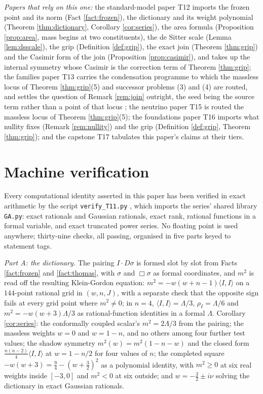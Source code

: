 \documentclass[11pt]{article}
\theoremstyle{definition}
\newcommand{\ip}[2]{\langle #1, #2\rangle}
\begin{document}
\emph{Papers that rely on this one:} the standard-model paper T12 \cite{ButlerT12} imports the frozen point and its norm (Fact \ref{fact:frozen}), the dictionary and its weight polynomial (Theorem \ref{thm:dictionary}, Corollary \ref{cor:series}), the area formula (Proposition \ref{prop:area}, mass begins at two constituents), the de Sitter scale (Lemma \ref{lem:dsscale}), the grip (Definition \ref{def:grip}), the exact join (Theorem \ref{thm:grip}) and the Casimir form of the join (Proposition \ref{prop:casimir}), and takes up the internal symmetry whose Casimir is the correction term of Theorem \ref{thm:grip}; the families paper T13 \cite{ButlerT13} carries the condensation programme to which the massless locus of Theorem \ref{thm:grip}(5) and successor problems (3) and (4) are routed, and settles the question of Remark \ref{rem:join} outright, the seed being the source term rather than a point of that locus \cite[Props.~4.1-4.2]{ButlerT13}; the neutrino paper T15 \cite{ButlerT15} is routed the massless locus of Theorem \ref{thm:grip}(5); the foundations paper T16 \cite{ButlerT16} imports what nullity fixes (Remark \ref{rem:nullity}) and the grip (Definition \ref{def:grip}, Theorem \ref{thm:grip}); and the capstone T17 \cite{ButlerT17} tabulates this paper's claims at their tiers.

\section{Machine verification}\label{sec:verification}

Every computational identity asserted in this paper has been verified in exact arithmetic by the script \texttt{verify\_T11.py} \cite{ButlerVerifyT11}, which imports the series' shared library \texttt{GA.py}: exact rationals and Gaussian rationals, exact rank, rational functions in a formal variable, and exact truncated power series. No floating point is used anywhere; thirty-nine checks, all passing, organised in five parts keyed to statement tags.

\emph{Part A: the dictionary.} The pairing $I \cdot D\sigma$ is formed slot by slot from Facts \ref{fact:frozen} and \ref{fact:thomas}, with $\sigma$ and $\Box\sigma$ as formal coordinates, and $m^{2}$ is read off the resulting Klein-Gordon equation: $m^{2} = -w(w+n-1)\ip{I}{I}$ on a $144$-point rational grid in $(w, n, J)$, with a separate check that the opposite sign fails at every grid point where $m^{2} \neq 0$; in $n = 4$, $\ip{I}{I} = \Lambda/3$, $\rho_{I} = \Lambda/6$ and $m^{2} = -w(w+3)\Lambda/3$ as rational-function identities in a formal $\Lambda$. Corollary \ref{cor:series}: the conformally coupled scalar's $m^{2} = 2\Lambda/3$ from the pairing; the massless weights $w = 0$ and $w = 1-n$, and no others among four further test values; the shadow symmetry $m^{2}(w) = m^{2}(1-n-w)$ and the closed form $\tfrac{n(n-2)}{4}\ip{I}{I}$ at $w = 1 - n/2$ for four values of $n$; the completed square $-w(w+3) = \tfrac94 - (w+\tfrac32)^{2}$ as a polynomial identity, with $m^{2} \ge 0$ at six real weights inside $[-3,0]$ and $m^{2} < 0$ at six outside; and $w = -\tfrac32 \pm i\nu$ solving the dictionary in exact Gaussian rationals.
\end{document}
